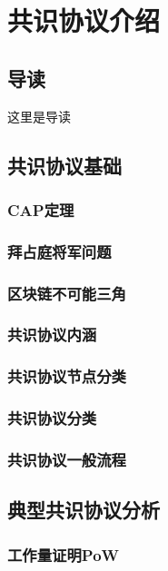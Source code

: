 \chapter{共识协议介绍}

\section{导读}

这里是导读

\section{共识协议基础}

\subsection{CAP定理}

\subsection{拜占庭将军问题}

\subsection{区块链不可能三角}

\subsection{共识协议内涵}

\subsection{共识协议节点分类}

\subsection{共识协议分类}

\subsection{共识协议一般流程}

\section{典型共识协议分析}

\subsection{工作量证明PoW}


